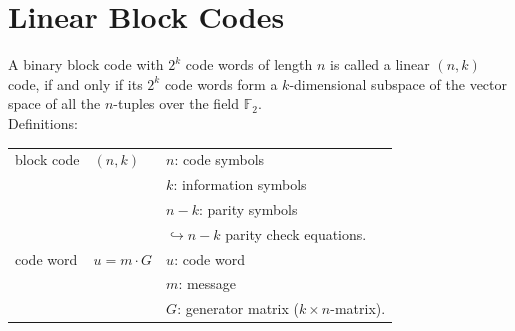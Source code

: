 \section{Linear Block Codes}
A binary block code with $2^k$ code words of length $n$ is called a linear $(n,k)$ code, if and only if its $2^k$ 
code words form a $k$-dimensional subspace of the vector space of all the $n$-tuples over the field $\mathbb{F}_2$.\\

Definitions:\\
\begin{tabular}{| l |l | l |}
	\hline
	 block code			&	$(n,k)$				&	$n$: code symbols\\
						&						&	$k$: information symbols\\
						&						&	$n-k$: parity symbols \\
						&						&   $\hookrightarrow n-k$ parity check equations.\\
	\hline
	code word			&	$u=m \cdot G$ 		&	$u$: code word \\
						&						&   $m$: message \\
						&						&	$G$: generator matrix ($k \times n$-matrix).\\


\end{tabular}
